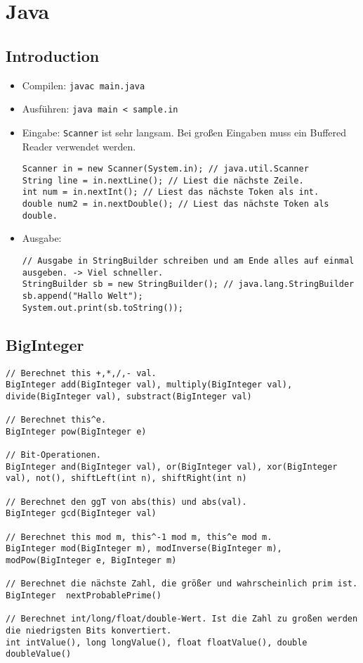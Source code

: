\section{Java}
\lstset{language=Java}

\subsection{Introduction}

\begin{itemize}
\item Compilen: \lstinline{javac main.java}
\item Ausführen: \lstinline{java main < sample.in}
\item Eingabe:
\lstinline{Scanner} ist sehr langsam. Bei großen Eingaben muss ein Buffered Reader verwendet werden.
\begin{lstlisting}
Scanner in = new Scanner(System.in); // java.util.Scanner
String line = in.nextLine(); // Liest die nächste Zeile.
int num = in.nextInt(); // Liest das nächste Token als int.
double num2 = in.nextDouble(); // Liest das nächste Token als double.
\end{lstlisting}
\item Ausgabe:
\begin{lstlisting}
// Ausgabe in StringBuilder schreiben und am Ende alles auf einmal ausgeben. -> Viel schneller.
StringBuilder sb = new StringBuilder(); // java.lang.StringBuilder
sb.append("Hallo Welt");
System.out.print(sb.toString());
\end{lstlisting}
\end{itemize}

\subsection{BigInteger}
\begin{lstlisting}
// Berechnet this +,*,/,- val.
BigInteger add(BigInteger val), multiply(BigInteger val), divide(BigInteger val), substract(BigInteger val)

// Berechnet this^e.
BigInteger pow(BigInteger e)

// Bit-Operationen.
BigInteger and(BigInteger val), or(BigInteger val), xor(BigInteger val), not(), shiftLeft(int n), shiftRight(int n)

// Berechnet den ggT von abs(this) und abs(val).
BigInteger gcd(BigInteger val)

// Berechnet this mod m, this^-1 mod m, this^e mod m.
BigInteger mod(BigInteger m), modInverse(BigInteger m), modPow(BigInteger e, BigInteger m)

// Berechnet die nächste Zahl, die größer und wahrscheinlich prim ist.
BigInteger  nextProbablePrime()

// Berechnet int/long/float/double-Wert. Ist die Zahl zu großen werden die niedrigsten Bits konvertiert.
int intValue(), long longValue(), float floatValue(), double doubleValue() 
\end{lstlisting}
\lstset{language=C++}